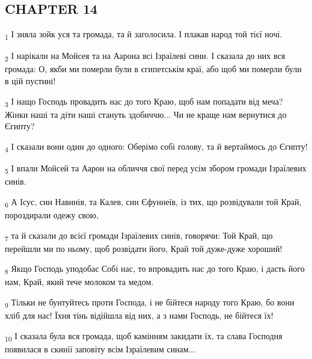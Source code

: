 \subsection{CHAPTER 14}
\begin{tcolorbox}
\textsubscript{1} І зняла зойк уся та громада, та й заголосила. І плакав народ той тієї ночі.
\end{tcolorbox}
\begin{tcolorbox}
\textsubscript{2} І нарікали на Мойсея та на Аарона всі Ізраїлеві сини. І сказала до них вся громада: О, якби ми померли були в єгипетськім краї, або щоб ми померли були в цій пустині!
\end{tcolorbox}
\begin{tcolorbox}
\textsubscript{3} І нащо Господь провадить нас до того Краю, щоб нам попадати від меча? Жінки наші та діти наші стануть здобиччю... Чи не краще нам вернутися до Єгипту?
\end{tcolorbox}
\begin{tcolorbox}
\textsubscript{4} І сказали вони один до одного: Оберімо собі голову, та й вертаймось до Єгипту!
\end{tcolorbox}
\begin{tcolorbox}
\textsubscript{5} І впали Мойсей та Аарон на обличчя свої перед усім збором громади Ізраїлевих синів.
\end{tcolorbox}
\begin{tcolorbox}
\textsubscript{6} А Ісус, син Навинів, та Калев, син Єфуннеїв, із тих, що розвідували той Край, пороздирали одежу свою,
\end{tcolorbox}
\begin{tcolorbox}
\textsubscript{7} та й сказали до всієї громади Ізраїлевих синів, говорячи: Той Край, що перейшли ми по ньому, щоб розвідати його, Край той дуже-дуже хороший!
\end{tcolorbox}
\begin{tcolorbox}
\textsubscript{8} Якщо Господь уподобає Собі нас, то впровадить нас до того Краю, і дасть його нам, Край, який тече молоком та медом.
\end{tcolorbox}
\begin{tcolorbox}
\textsubscript{9} Тільки не бунтуйтесь проти Господа, і не бійтеся народу того Краю, бо вони хліб для нас! Їхня тінь відійшла від них, а з нами Господь, не бійтеся їх!
\end{tcolorbox}
\begin{tcolorbox}
\textsubscript{10} І сказала була вся громада, щоб камінням закидати їх, та слава Господня появилася в скинії заповіту всім Ізраїлевим синам...
\end{tcolorbox}
